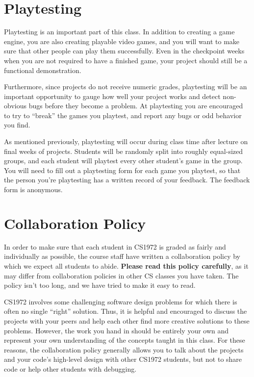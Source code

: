 \documentclass{cs1972}
\begin{document}
 \section*{Playtesting}
 Playtesting is an important part of this class. In addition to creating a game engine, you are also creating playable video games, and you will want to make sure that other people can play them successfully. Even in the checkpoint weeks when you are not required to have a finished game, your project should still be a functional demonstration.
 
 Furthermore, since projects do not receive numeric grades, playtesting will be an important opportunity to gauge how well your project works and detect non-obvious bugs before they become a problem. At playtesting you are encouraged to try to ``break'' the games you playtest, and report any bugs or odd behavior you find. 
 
 As mentioned previously, playtesting will occur during class time after lecture on final weeks of projects. Students will be randomly split into roughly equal-sized groups, and each student will playtest every other student's game in the group. You will need to fill out a playtesting form for each game you playtest, so that the person you're playtesting has a written record of your feedback. The feedback form is anonymous.
 
 \section*{Collaboration Policy}
 In order to make sure that each student in CS1972 is graded as fairly and individually as possible, the course staff have written a collaboration policy by which we expect all students to abide. \textbf{Please read this policy carefully}, as it may differ from collaboration policies in other CS classes you have taken. The policy isn't too long, and we have tried to make it easy to read.
 
 CS1972 involves some challenging software design problems for which there is often no single ``right'' solution. Thus, it is helpful and encouraged to discuss the projects with your peers and help each other find more creative solutions to these problems. However, the work you hand in should be entirely your own and represent your own understanding of the concepts taught in this class. For these reasons, the collaboration policy generally allows you to talk about the projects and your code's high-level design with other CS1972 students, but not to share code or help other students with debugging. 
 
\end{document}
